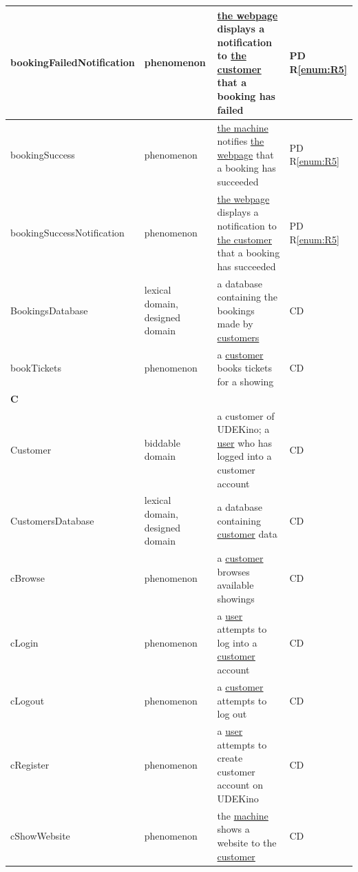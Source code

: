 \documentclass[a4paper,10pt,titlepage,bibtotoc,bibtotocnumbered]{scrreprt}
\begin{document}
\begin{longtable}{|l|p{3cm}|p{5cm}|l|}
\hline
\hypertarget{glossary:bookingFailedNotification}{bookingFailedNotification} & phenomenon & \hyperlink{glossary:WebpageBookTickets}{the webpage} displays a notification to \hyperlink{glossary:Customer}{the customer} that a booking has failed & PD R\ref{enum:R5}\\
\hline
\hypertarget{glossary:bookingSuccess}{bookingSuccess} & phenomenon & \hyperlink{glossary:UDEKino}{the machine} notifies \hyperlink{glossary:WebpageBookTickets}{the webpage} that a booking has succeeded & PD R\ref{enum:R5}\\
\hline
\hypertarget{glossary:bookingSuccessNotification}{bookingSuccessNotification} & phenomenon & \hyperlink{glossary:WebpageBookTickets}{the webpage} displays a notification to \hyperlink{glossary:Customer}{the customer} that a booking has succeeded & PD R\ref{enum:R5}\\
\hline
\hypertarget{glossary:BookingsDatabase}{BookingsDatabase} & lexical domain, designed domain & a database containing the bookings made by \hyperlink{glossary:Customer}{customers} & CD\\
\hline
\hypertarget{glossary:bookTickets}{bookTickets} & phenomenon & a \hyperlink{glossary:Customer}{customer} books tickets for a showing & CD\\
\hline
\multicolumn{4}{|l|}{\textbf{C}}\\
\hline
\hypertarget{glossary:Customer}{Customer} & biddable domain & a customer of UDEKino; a \hyperlink{glossary:User}{user} who has logged into a customer account & CD\\
\hline
\hypertarget{glossary:CustomersDatabase}{CustomersDatabase} & lexical domain, designed domain & a database containing \hyperlink{glossary:Customer}{customer} data & CD\\
\hline
\hypertarget{glossary:cBrowse}{cBrowse} & phenomenon & a \hyperlink{glossary:Customer}{customer} browses available showings & CD\\
\hline
\hypertarget{glossary:cLogin}{cLogin} & phenomenon & a \hyperlink{glossary:User}{user} attempts to log into a \hyperlink{glossary:Customer}{customer} account & CD\\
\hline
\hypertarget{glossary:cLogout}{cLogout} & phenomenon & a \hyperlink{glossary:Customer}{customer} attempts to log out & CD\\
\hline
\hypertarget{glossary:cRegister}{cRegister} & phenomenon & a \hyperlink{glossary:User}{user} attempts to create customer account on UDEKino & CD\\
\hline
\hypertarget{glossary:cShowWebsite}{cShowWebsite} & phenomenon & the \hyperlink{glossary:UDEKino}{machine} shows a website to the \hyperlink{glossary:Customer}{customer} & CD\\

\end{longtable}
\end{document}
